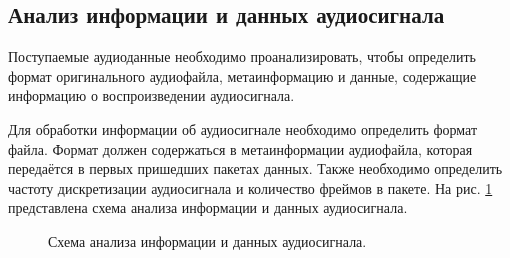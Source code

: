     \subsection{Анализ информации и данных аудиосигнала}
        \par Поступаемые аудиоданные необходимо проанализировать, 
        чтобы определить формат оригинального аудиофайла, 
        метаинформацию и данные, содержащие информацию о воспроизведении аудиосигнала.

        \par Для обработки информации об аудиосигнале необходимо определить формат файла.
        Формат должен содержаться в метаинформации аудиофайла, которая передаётся в первых пришедших пакетах данных.
        Также необходимо определить частоту дискретизации аудиосигнала и количество фреймов в пакете.
        На рис. \ref{fig:parser-analys} представлена схема анализа информации и данных аудиосигнала.
        \begin{figure}[!h]
            \caption{Схема анализа информации и данных аудиосигнала.}
            \label{fig:parser-analys}
        \end{figure}

